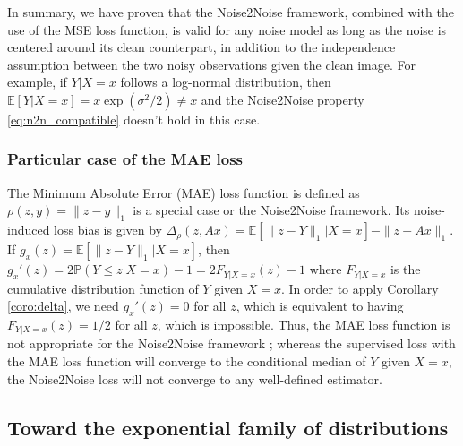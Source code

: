 In summary, we have proven that the Noise2Noise framework, combined with the use of the MSE loss function, is valid for any noise model as long as the noise is centered around its clean counterpart,
in addition to the independence assumption between the two noisy observations given the clean image.
For example, if $Y|X=x$ follows a log-normal distribution, then $\mathbb{E}[Y|X=x] = x \exp(\sigma^2/2) \neq x$ and the Noise2Noise property \eqref{eq:n2n_compatible} doesn't hold in this case.

\subsubsection{Particular case of the MAE loss}

The Minimum Absolute Error (MAE) loss function is defined as $\rho(z, y) = \| z - y \|_1$ is a special case or the Noise2Noise framework.
Its noise-induced loss bias is given by $\Delta_\rho(z, Ax) = \mathbb{E}[\| z - Y \|_1 | X=x] - \| z - Ax \|_1$.
If $g_x(z) = \mathbb{E}[\| z - Y \|_1 | X=x]$, then $g_x'(z) = 2 \mathbb{P}(Y \leq z | X=x) - 1 = 2 F_{Y|X=x}(z) - 1$ where $F_{Y|X=x}$ is the cumulative distribution function of $Y$ given $X=x$.
In order to apply Corollary \ref{coro:delta}, we need $g_x'(z) = 0$ for all $z$, which is equivalent to having $F_{Y|X=x}(z) = 1/2$ for all $z$, which is impossible.
Thus, the MAE loss function is not appropriate for the Noise2Noise framework ; whereas the supervised loss with the MAE loss function will converge to the conditional median of $Y$ given $X=x$, the Noise2Noise loss will not converge to any well-defined estimator.


\subsection{Toward the exponential family of distributions}

